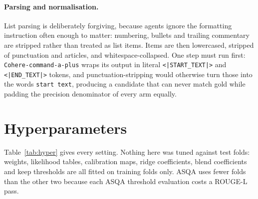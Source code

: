 \documentclass[11pt]{article}
\begin{document}
\paragraph{Parsing and normalisation.}
List parsing is deliberately forgiving, because agents ignore the formatting instruction often enough to matter: numbering, bullets and trailing commentary are stripped rather than treated as list items. Items are then lowercased, stripped of punctuation and articles, and whitespace-collapsed. One step must run first: \texttt{Cohere-command-a-plus} wraps its output in literal \verb+<|START_TEXT|>+ and \verb+<|END_TEXT|>+ tokens, and punctuation-stripping would otherwise turn those into the words \texttt{start text}, producing a candidate that can never match gold while padding the precision denominator of every arm equally.

\section{Hyperparameters}
\label{app:hyper}

Table~\ref{tab:hyper} gives every setting. Nothing here was tuned against test folds: weights, likelihood tables, calibration maps, ridge coefficients, blend coefficients and keep thresholds are all fitted on training folds only. ASQA uses fewer folds than the other two because each ASQA threshold evaluation costs a ROUGE-L pass.
\end{document}
